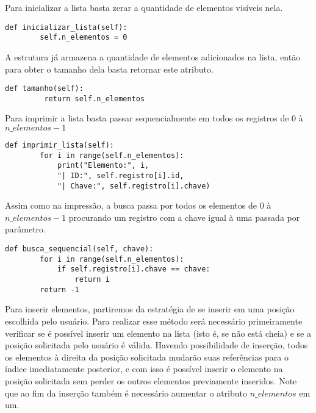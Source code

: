 \documentclass[a4paper, twocolumn]{article}
\theoremstyle{definition}
\begin{document}
Para inicializar a lista basta zerar a quantidade de elementos visíveis nela.

\begin{lstlisting}[label=lista_linear_seq,caption= Lista linear sequencial (inicialização)]
def inicializar_lista(self):
        self.n_elementos = 0
\end{lstlisting}

A estrutura já armazena a quantidade de elementos adicionados na lista, então para obter o tamanho dela basta retornar este atributo.

\begin{lstlisting}[label=lista_linear_seq,caption= Lista linear sequencial (tamanho)]
def tamanho(self):
         return self.n_elementos
\end{lstlisting}

Para imprimir a lista basta passar sequencialmente em todos os registros de 0 à $n\_elementos-1$

\begin{lstlisting}[label=lista_linear_seq,caption= Lista linear sequencial (exibição)]
def imprimir_lista(self):     
        for i in range(self.n_elementos):
            print("Elemento:", i, 
            "| ID:", self.registro[i].id, 
            "| Chave:", self.registro[i].chave)
\end{lstlisting}

Assim como na impressão, a busca passa por todos os elementos de 0 à $n\_elementos-1$ procurando um registro com a chave igual à uma passada por parâmetro.
\begin{lstlisting}[label=lista_linear_seq,caption= Lista linear sequencial (busca)]
def busca_sequencial(self, chave):
        for i in range(self.n_elementos):
            if self.registro[i].chave == chave:
                return i
        return -1

\end{lstlisting}

Para inserir elementos, partiremos da estratégia de se inserir em uma posição escolhida pelo usuário. Para realizar esse método será necessário primeiramente verificar se é possível inserir um elemento na lista (isto é, se não está cheia) e se a posição solicitada pelo usuário é válida. Havendo possibilidade de inserção, todos os elementos à direita da posição solicitada mudarão suas referências para o índice imediatamente posterior, e com isso é possível inserir o elemento na posição solicitada sem perder os outros elementos previamente inseridos. Note que ao fim da inserção também é necessário aumentar o atributo $n\_elementos$ em um.
\end{document}
